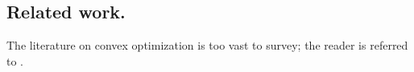 \documentclass[final,12pt]{colt2018} %
\begin{document}










 


\subsection{Related work.}
The literature on convex optimization is too vast to survey; the reader is referred to \cite{boyd,NesterovBook}. 
\end{document}
